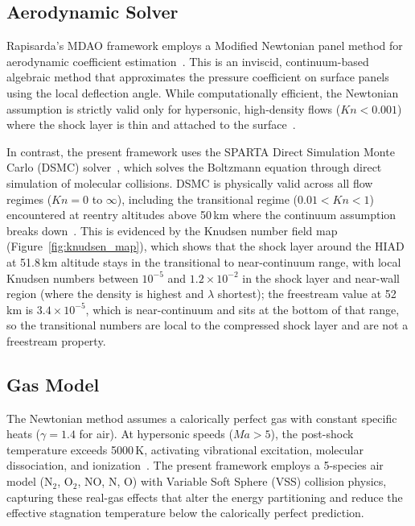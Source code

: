 \subsection{Aerodynamic Solver}
Rapisarda's MDAO framework employs a Modified Newtonian panel method for aerodynamic coefficient estimation~\cite{rapisarda2023mdao}. This is an inviscid, continuum-based algebraic method that approximates the pressure coefficient on surface panels using the local deflection angle. While computationally efficient, the Newtonian assumption is strictly valid only for hypersonic, high-density flows ($Kn < 0.001$) where the shock layer is thin and attached to the surface~\cite{AndersonHypersonic}.

In contrast, the present framework uses the SPARTA Direct Simulation Monte Carlo (DSMC) solver~\cite{plimpton2014sparta}, which solves the Boltzmann equation through direct simulation of molecular collisions. DSMC is physically valid across all flow regimes ($Kn = 0$ to $\infty$), including the transitional regime ($0.01 < Kn < 1$) encountered at reentry altitudes above 50\,km where the continuum assumption breaks down~\cite{bird1994molecular}. This is evidenced by the Knudsen number field map (Figure~\ref{fig:knudsen_map}), which shows that the shock layer around the HIAD at 51.8\,km altitude stays in the transitional to near-continuum range, with local Knudsen numbers between $10^{-5}$ and $1.2\times10^{-2}$ in the shock layer and near-wall region (where the density is highest and $\lambda$ shortest); the freestream value at 52\,km is $3.4\times10^{-5}$, which is near-continuum and sits at the bottom of that range, so the transitional numbers are local to the compressed shock layer and are not a freestream property.

\subsection{Gas Model}
The Newtonian method assumes a calorically perfect gas with constant specific heats ($\gamma = 1.4$ for air). At hypersonic speeds ($Ma > 5$), the post-shock temperature exceeds 5000\,K, activating vibrational excitation, molecular dissociation, and ionization~\cite{AndersonHypersonic}. The present framework employs a 5-species air model (N$_2$, O$_2$, NO, N, O) with Variable Soft Sphere (VSS) collision physics, capturing these real-gas effects that alter the energy partitioning and reduce the effective stagnation temperature below the calorically perfect prediction.

